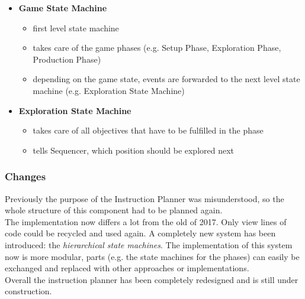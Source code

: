 \begin{itemize}
    \item \textbf{Game State Machine}
    \begin{itemize}
        \item first level state machine
        \item takes care of the game phases (e.g. Setup Phase, Exploration Phase, Production Phase)
         \item depending on the game state, events are forwarded to the next level state machine (e.g. Exploration State Machine)
    \end{itemize}
    \item \textbf{Exploration State Machine}
    \begin{itemize}
        \item takes care of all objectives that have to be fulfilled in the phase
        \item tells Sequencer, which position should be explored next
    \end{itemize}
\end{itemize}


\subsubsection{Changes}
Previously the purpose of the Instruction Planner was misunderstood, so the whole structure of
this component had to be planned again. \\
The implementation now differs a lot from the old of 2017. Only view lines of code could be recycled and used again.
A completely new system has been introduced: the \textit{hierarchical state machines}. The implementation of
this system now is more modular, parts (e.g. the state machines for the phases) can easily be exchanged and
replaced with other approaches or implementations. \\
Overall the instruction planner has been completely redesigned and is still under construction.


